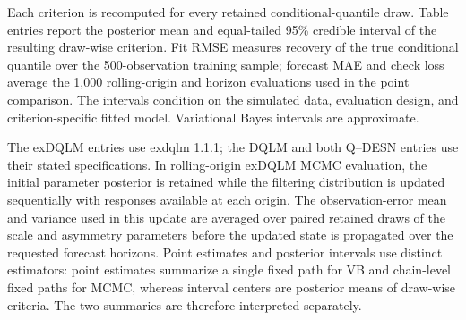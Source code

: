 Each criterion is recomputed for every retained conditional-quantile draw. Table entries report the posterior mean and equal-tailed 95\% credible interval of the resulting draw-wise criterion. Fit RMSE measures recovery of the true conditional quantile over the 500-observation training sample; forecast MAE and check loss average the 1,000 rolling-origin and horizon evaluations used in the point comparison. The intervals condition on the simulated data, evaluation design, and criterion-specific fitted model. Variational Bayes intervals are approximate.

The exDQLM entries use exdqlm 1.1.1; the DQLM and both Q--DESN entries use their stated specifications. In rolling-origin exDQLM MCMC evaluation, the initial parameter posterior is retained while the filtering distribution is updated sequentially with responses available at each origin. The observation-error mean and variance used in this update are averaged over paired retained draws of the scale and asymmetry parameters before the updated state is propagated over the requested forecast horizons. Point estimates and posterior intervals use distinct estimators: point estimates summarize a single fixed path for VB and chain-level fixed paths for MCMC, whereas interval centers are posterior means of draw-wise criteria. The two summaries are therefore interpreted separately.
